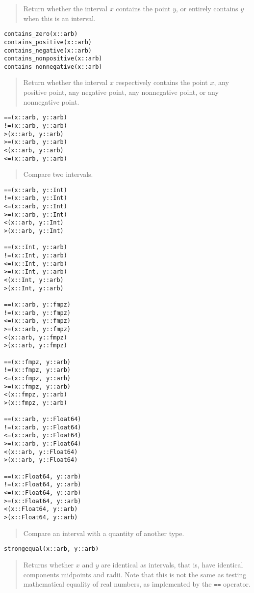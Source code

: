 \documentclass[a4paper,10pt]{article}
\newcommand{\code}{\lstinline}
\newcommand{\desc}[1]{\vspace{-3mm}\begin{quote}#1\end{quote}}
\begin{document}
{{\desc{Return whether the interval $x$ contains the point $y$,
or entirely contains $y$ when this is an interval.}

\begin{lstlisting}
contains_zero(x::arb)
contains_positive(x::arb)
contains_negative(x::arb)
contains_nonpositive(x::arb)
contains_nonnegative(x::arb)
\end{lstlisting}

\desc{Return whether the interval $x$ respectively contains the
point $x$, any positive point, any negative point, any nonnegative point,
or any nonnegative point.}

\begin{lstlisting}
==(x::arb, y::arb)
!=(x::arb, y::arb)
>(x::arb, y::arb)
>=(x::arb, y::arb)
<(x::arb, y::arb)
<=(x::arb, y::arb)
\end{lstlisting}

\desc{Compare two intervals.}

\begin{lstlisting}
==(x::arb, y::Int)
!=(x::arb, y::Int)
<=(x::arb, y::Int)
>=(x::arb, y::Int)
<(x::arb, y::Int)
>(x::arb, y::Int)

==(x::Int, y::arb)
!=(x::Int, y::arb)
<=(x::Int, y::arb)
>=(x::Int, y::arb)
<(x::Int, y::arb)
>(x::Int, y::arb)

==(x::arb, y::fmpz)
!=(x::arb, y::fmpz)
<=(x::arb, y::fmpz)
>=(x::arb, y::fmpz)
<(x::arb, y::fmpz)
>(x::arb, y::fmpz)

==(x::fmpz, y::arb)
!=(x::fmpz, y::arb)
<=(x::fmpz, y::arb)
>=(x::fmpz, y::arb)
<(x::fmpz, y::arb)
>(x::fmpz, y::arb)

==(x::arb, y::Float64)
!=(x::arb, y::Float64)
<=(x::arb, y::Float64)
>=(x::arb, y::Float64)
<(x::arb, y::Float64)
>(x::arb, y::Float64)

==(x::Float64, y::arb)
!=(x::Float64, y::arb)
<=(x::Float64, y::arb)
>=(x::Float64, y::arb)
<(x::Float64, y::arb)
>(x::Float64, y::arb)
\end{lstlisting}

\desc{Compare an interval with a quantity of another type.}

\begin{lstlisting}
strongequal(x::arb, y::arb)
\end{lstlisting}

\desc{Returns whether $x$ and $y$ are identical as intervals, that is,
have identical components midpoints and radii. Note that this is
not the same as testing mathematical equality of real numbers,
as implemented by the \code{==} operator.}

}}
\end{document}
